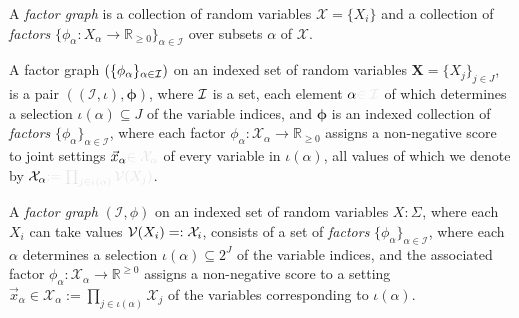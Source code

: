 {%
\begin{quickdefn}
A \emph{factor graph} is a collection of random variables $\mathcal X = \{X_i\}$ and a collection of \emph{factors} $\{\phi_\alpha\colon X_\alpha \to \mathbb R_{\geq0}\}_{\alpha \in \mathcal I }$ over subsets $\alpha$ of $\mathcal X$.
\end{quickdefn}
\begin{defn}
	A factor graph $ (\{\phi_\alpha\}_{\alpha \in \cal I})$ on an indexed set of random variables $\mathbf X = \{ X_j \}_{j \in J}$, 
	is a pair $((\mathcal I,\iota), \boldsymbol\phi)$, where $\cal I$ is a set,
	each element $\alpha\notation{\in \mathcal I}$ of which determines a selection $\iota(\alpha) \subseteq J$ of the variable indices, and
	$\boldsymbol\phi$ is an indexed collection of \emph{factors} $\{\phi_\alpha\}_{\alpha \in \mathcal I }$, 
	where each factor $\phi_\alpha \colon \mathcal X_\alpha \to \mathbb R_{\geq 0}$ assigns a non-negative score to joint settings $\vec x_\alpha \notation{\in \mathcal X_\alpha}$ of every variable in $\iota(\alpha)$, all values of which we denote by $\mathcal X_\alpha\notation{ := \prod_{j \in \iota(\alpha)} \mathcal V(X_j)}$. 
\end{defn}
\begin{fulldefn}
A \emph{factor graph} $(\mathcal I, \phi)$ on an indexed set of random variables $X : \Sigma_{}$, where each $X_i$ can take values $\mathcal V(X_i) =: \mathcal X_i$, consists of  
a set of \emph{factors} $\{\phi_\alpha\}_{\alpha \in \mathcal I }$, where each $\alpha$ determines a selection $\iota(\alpha) \subseteq 2^J$ of the variable indices, and the associated factor $\phi_\alpha \colon \mathcal X_\alpha \to \mathbb R^{\geq 0}$ assigns a non-negative score to a setting
$\vec x_\alpha \in \mathcal X_\alpha := \prod_{j \in \iota(\alpha)} \mathcal X_j$ of the variables corresponding to $\iota(\alpha)$.


\end{fulldefn}}
